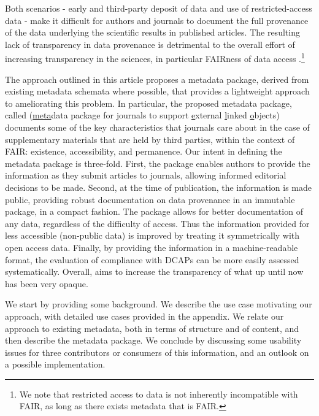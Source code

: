Both scenarios - early and third-party deposit of data and use of restricted-access data - make it difficult for authors and journals to document the full provenance of the data underlying the scientific results in published articles. The resulting lack of transparency in data provenance is detrimental to the overall effort of increasing transparency in the sciences, in particular FAIRness of data access \citep{HagstromFORCE112014}.\footnote{We note that restricted access to data is not inherently incompatible with FAIR, as long as there exists metadata that is FAIR.}

The approach outlined in this article proposes a metadata package, derived from existing metadata schemata where possible, that provides a lightweight approach to ameliorating this problem. In particular, the proposed metadata package, called \metajelo (\underline{meta}data package for \underline{j}ournals to support \underline{e}xternal \underline{l}inked \underline{o}bjects) documents some of the key characteristics that journals care about in the case of supplementary materials that are held by third parties, within the context of FAIR: existence, accessibility, and permanence. Our intent in defining the metadata package is three-fold. First, the package enables  authors to provide the information as they submit articles to journals, allowing informed editorial decisions to be made. Second, at the time of publication, the information is made public, providing robust documentation on data provenance in an immutable package, in a compact fashion.  The package allows for better documentation of any data, regardless of the difficulty of access.   Thus the information provided for less accessible (non-public data) is improved by treating it symmetrically with open access data. Finally, by providing the information in a machine-readable format, the evaluation of compliance with \acp{DCAP} can be more easily assessed systematically. Overall, \metajelo aims to   increase the transparency of what up until now has been very opaque.

We start by providing some background. We describe the use case motivating our approach, with detailed use cases provided in the appendix. We relate our approach to existing metadata, both in terms of structure and of content, and then describe the metadata package. We conclude by discussing some usability issues for three contributors or consumers of this information, and an outlook on a possible implementation.